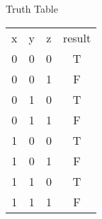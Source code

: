 \documentclass{article}
\begin{document}
\begin{enumerate}
        \begin{center}
            Truth Table\\
            \begin{tabular}{c | c | c | c}
                x & y & z & result\\
                0 & 0 & 0 & T\\
                0 & 0 & 1 & F\\
                0 & 1 & 0 & T\\
                0 & 1 & 1 & F\\
                1 & 0 & 0 & T\\
                1 & 0 & 1 & F\\
                1 & 1 & 0 & T\\
                1 & 1 & 1 & F\\
            \end{tabular}\\[0.25in]
        \end{center}
        


\end{enumerate}
\end{document}
